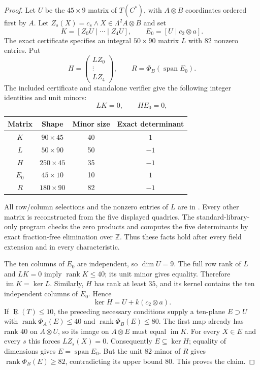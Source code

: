 \begin{proof}
Let $U$ be the $45\times9$ matrix of $T(C^*)$, with $A\otimes B$
coordinates ordered first by $A$. Let
$Z_s(X)=c_s\wedge X\in\Lambda^2A\otimes B$ and set
\[
 K=[Z_0U\mid\cdots\mid Z_4U],\qquad
 E_0=[U\mid c_2\otimes a].
\]
The exact certificate specifies an integral $50\times90$
matrix $L$ with $82$ nonzero entries. Put
\[
 H=\begin{pmatrix}LZ_0\\\vdots\\LZ_4\end{pmatrix},
 \qquad R=\Phi_B(\operatorname{span}E_0).
\]
The included certificate and standalone verifier give the
following integer identities and unit minors:
\[
 LK=0,\qquad HE_0=0,
\]
\begin{center}
\begin{tabular}{c|c|c|c}
Matrix&Shape&Minor size&Exact determinant\\\hline
$K$&$90\times45$&40&$1$\\
$L$&$50\times90$&50&$-1$\\
$H$&$250\times45$&35&$-1$\\
$E_0$&$45\times10$&10&$1$\\
$R$&$180\times90$&82&$-1$
\end{tabular}
\end{center}
All row/column selections and the nonzero entries of $L$ are
in . Every other
matrix is reconstructed from the five displayed quadrics.
The standard-library-only program
 checks the
zero products and computes the five determinants by exact
fraction-free elimination over $\mathbb Z$. Thus these facts
hold after every field extension and in every characteristic.

The ten columns of $E_0$ are independent, so $\dim U=9$.
The full row rank of $L$ and $LK=0$ imply
$\operatorname{rank}K\leq40$; its unit minor gives equality.
Therefore $\operatorname{im}K=\ker L$. Similarly, $H$ has
rank at least $35$, and its kernel contains the ten
independent columns of $E_0$. Hence
\[
 \ker H=U+k(c_2\otimes a).
\]
If $\underline{\operatorname R}(T)\leq10$, the preceding necessary conditions supply a
ten-plane $E\supset U$ with
$\operatorname{rank}\Phi_A(E)\leq40$ and
$\operatorname{rank}\Phi_B(E)\leq80$.
The first map already has rank $40$ on $A\otimes U$, so
its image on $A\otimes E$ must equal $\operatorname{im}K$.
For every $X\in E$ and every $s$ this forces
$LZ_s(X)=0$. Consequently $E\subseteq\ker H$; equality of
dimensions gives $E=\operatorname{span}E_0$. But the unit
$82$-minor of $R$ gives $\operatorname{rank}\Phi_B(E)\geq82$,
contradicting its upper bound $80$. This proves the claim.
\end{proof}

